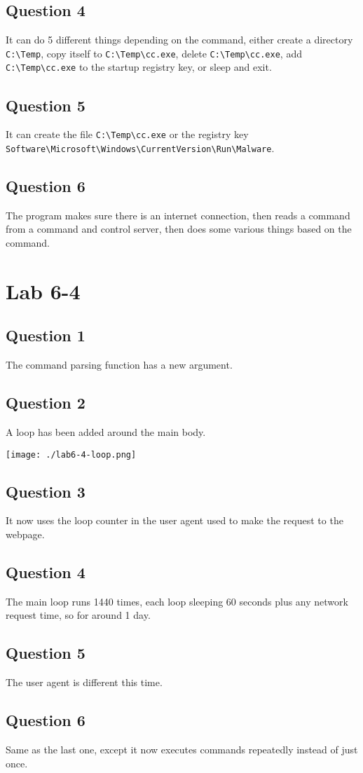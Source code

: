 \documentclass[11pt]{article}
\begin{document}
\subsection{Question 4}
\label{sec:orgc98395e}
It can do 5 different things depending on the command, either create a
directory \texttt{C:\textbackslash{}Temp}, copy itself to \texttt{C:\textbackslash{}Temp\textbackslash{}cc.exe}, delete
\texttt{C:\textbackslash{}Temp\textbackslash{}cc.exe}, add \texttt{C:\textbackslash{}Temp\textbackslash{}cc.exe} to the startup registry key, or
sleep and exit.
\subsection{Question 5}
\label{sec:org91519e1}
It can create the file \texttt{C:\textbackslash{}Temp\textbackslash{}cc.exe} or the registry key
\texttt{Software\textbackslash{}Microsoft\textbackslash{}Windows\textbackslash{}CurrentVersion\textbackslash{}Run\textbackslash{}Malware}.
\subsection{Question 6}
\label{sec:orgddc8f56}
The program makes sure there is an internet connection, then reads a
command from a command and control server, then does some various
things based on the command.
\section{Lab 6-4}
\label{sec:orgd790e3c}
\subsection{Question 1}
\label{sec:org3c55329}
The command parsing function has a new argument.
\subsection{Question 2}
\label{sec:org20ee8a4}
A loop has been added around the main body.

\begin{center}
\texttt{[image: ./lab6-4-loop.png]}
\end{center}
\subsection{Question 3}
\label{sec:orgbd5b4b5}
It now uses the loop counter in the user agent used to make the
request to the webpage.
\subsection{Question 4}
\label{sec:org238c5e1}
The main loop runs 1440 times, each loop sleeping 60 seconds plus any
network request time, so for around 1 day.
\subsection{Question 5}
\label{sec:orgea8b759}
The user agent is different this time.
\subsection{Question 6}
\label{sec:orge0deb04}
Same as the last one, except it now executes commands repeatedly
instead of just once.
\end{document}
